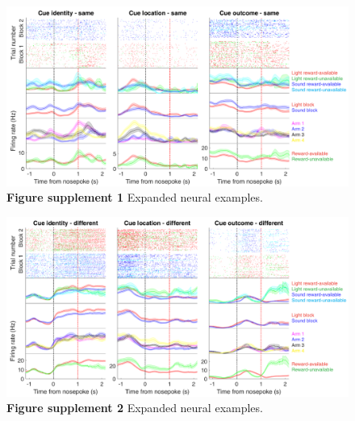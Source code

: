 \documentclass[11pt]{article}
\newcommand{\bsf}[1]{\textbf{#1}}
\begin{document}
 \begin{figure}[ht!]
\centering
\includegraphics[width=\textwidth]{Fig 8 - NP Neural examples SUPP1.pdf}
\caption*{\bsf{Figure supplement 1} Expanded neural examples.}
\label{fig:NP_examplesSUPP1}
\end{figure} \clearpage

 \begin{figure}[ht!]
\centering
\includegraphics[width=\textwidth]{Fig 8 - NP Neural examples SUPP2.pdf}
\caption*{\bsf{Figure supplement 2} Expanded neural examples.}
\label{fig:NP_examplesSUPP2}
\end{figure} \clearpage
\end{document}
